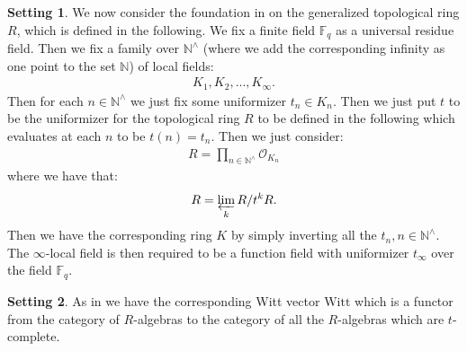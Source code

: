 \documentclass[12pt]{article}
\theoremstyle{definition}
\newtheorem{setting}{Setting}
\begin{document}
\begin{setting}
We now consider the foundation in \cite{2LH} on the generalized topological ring $R$, which is defined in the following. We fix a finite field $\mathbb{F}_q$ as a universal residue field. Then we fix a family over $\mathbb{N}^\wedge$ (where we add the corresponding infinity as one point to the set $\mathbb{N}$) of local fields:
\begin{align}
K_1,K_2,...,K_\infty.
\end{align}
Then for each $n\in \mathbb{N}^\wedge$ we just fix some uniformizer $t_n\in K_n$. Then we just put $t$ to be the uniformizer for the topological ring $R$ to be defined in the following which evaluates at each $n$ to be $t(n)=t_n$. Then we just consider:
\begin{align}
R = \prod_{n\in \mathbb{N}^\wedge} \mathcal{O}_{K_n}
\end{align}
where we have that:
\begin{align}
R = \varprojlim_k R/t^k R.
\end{align}
Then we have the corresponding ring $K$ by simply inverting all the $t_n,n\in \mathbb{N}^\wedge$. The $\infty$-local field is then required to be a function field with uniformizer $t_\infty$ over the field $\mathbb{F}_q$. 
\end{setting}

\begin{setting}
As in \cite{2LH} we have the corresponding Witt vector $\mathrm{Witt}$ which is a functor from the category of $R$-algebras to the category of all the $R$-algebras which are $t$-complete.
\end{setting}
\end{document}
